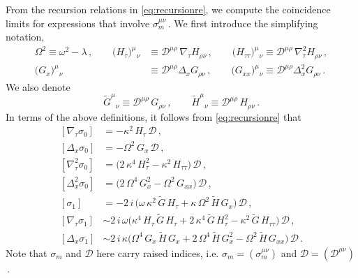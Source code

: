 \documentclass[11pt]{article}
\newcommand{\be}{\begin{equation}}
\newcommand{\ee}{\end{equation}}
\newcommand{\CD}{\mathcal{D}}
\renewcommand{\tilde}[1]{\widetilde{#1}}
\begin{document}
From the recursion relations in \eqref{eq:recursionre}, we compute the coincidence limits for expressions that involve $\sigma_m^{\mu\nu}$\,. We first introduce the simplifying notation,
%
\begin{subequations} \label{eq:notation}
\begin{align}
	\Omega^2 \equiv \omega^2 - \lambda\,,
		\qquad
	\bigl( H_\tau \bigr)^\mu{}_\nu & \equiv \CD^{\mu\rho} \, \nabla_{\!\tau} H_{\rho\nu}\,,
		\qquad
	\bigl( H_{\tau\tau} \bigr)^\mu{}_\nu \equiv \CD^{\mu\rho} \,  \nabla_{\!\tau}^2 H_{\rho\nu}\,, \\[2pt]
	\bigl( G_x \bigr)^\mu{}_\nu & \equiv \CD^{\mu\rho} \Delta_x G_{\rho\nu} \,,
		\qquad
	\bigl( G_{xx} \bigr)^\mu{}_\nu \equiv \CD^{\mu\rho} \Delta_{x}^2 G_{\rho\nu} \,.	
\end{align}
\end{subequations}
%
We also denote
%
\be
	\tilde{G}^\mu{}_\nu \equiv \CD^{\mu\rho} \, G_{\rho\nu}\,, 
		\qquad
	\tilde{H}^\mu{}_\nu \equiv \CD^{\mu\rho} \, H_{\rho\nu}\,.
\ee
%
In terms of the above definitions, it follows from \eqref{eq:recursionre} that 
%
\begin{subequations} \label{eq:cls}
\begin{align}
	[\nabla_{\!\tau} \sigma_0] & = - \kappa^2 \, H_\tau \, \CD\,, \\[2pt]
	[\Delta_x \sigma_0] & = - \Omega^2 \, G_x \, \CD\,, \\[2pt]
	[\nabla_{\!\tau}^2 \sigma_0] & = \bigl( 2 \, \kappa^4 \, H_{\tau}^2 - \kappa^2 \, H_{\tau\tau}  \bigr) \, \CD\,, \\[2pt]
	[\Delta_x^2 \sigma_0] & = \bigl( 2 \, \Omega^4 \, G_x^2  - \Omega^2 \, G_{xx}  \bigr) \, \CD\,, \\[2pt]
	[\sigma_1] & = - 2 \, i \, \bigl( \omega \, \kappa^2 \, \tilde{G} \, H_\tau + \kappa \, \Omega^2 \, \tilde{H} \, G_x \bigr) \, \CD\,, \\[2pt]
	[\nabla_{\!\tau} \sigma_1] & \sim 2 \, i \, \omega \bigl( \kappa^4 \, H_\tau \, \tilde{G} \, H_\tau + 2 \, \kappa^4 \, \tilde{G} \, H_\tau^2 - \kappa^2 \, \tilde{G} \, H_{\tau\tau} \bigr) \, \CD\,, \\[2pt]
	[\Delta_x \sigma_1] & \sim 2 \, i \, \kappa \bigl( \Omega^4 \, G_x \, \tilde{H} \, G_x + 2 \, \Omega^4 \, \tilde{H} \, G_x^2 - \Omega^2 \, \tilde{H} \, G_{xx}  \bigr) \, \CD\,.
\end{align}
\end{subequations}
%
Note that $\sigma_m$ and $\CD$ here carry raised indices, i.e. $\sigma_m = (\sigma_m^{\mu\nu})$ and $\CD = (\CD^{\mu\nu})$\,. 
\end{document}
